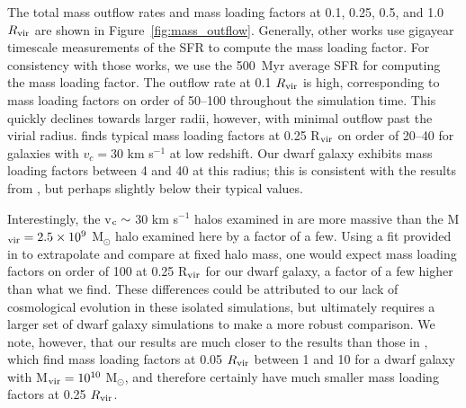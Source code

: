 \documentclass[twocolumn]{aastex61}
\begin{document}
The total mass outflow rates and mass loading factors at 0.1, 0.25, 0.5, and 1.0 $R_{\rm vir}$ are shown in Figure~\ref{fig:mass_outflow}. Generally, other works use gigayear timescale measurements of the SFR to compute the mass loading factor. For consistency with those works, we use the 500~Myr average SFR for computing the mass loading factor. The outflow rate at 0.1 $R_{\rm vir}$ is high, corresponding to mass loading factors on order of 50--100 throughout the simulation time. This quickly declines towards larger radii, however, with minimal outflow past the virial radius. \citet{Muratov2015} finds typical mass loading factors at 0.25 R$_{\rm vir}$ on order of 20--40 for galaxies with $v_{c} = 30$ km s$^{-1}$ at low redshift. Our dwarf galaxy exhibits mass loading factors between 4 and 40 at this radius; this is consistent with the results from \citet{Muratov2015}, but perhaps slightly below their typical values. 

Interestingly, the v$_{\rm c}\sim$ 30 km s$^{-1}$ halos examined in \citet{Muratov2015} are more massive than the M$_{\rm vir} = 2.5\times 10^9$ M$_{\odot}$ halo examined here by a factor of a few. Using a fit provided in \citet{Muratov2015} to extrapolate and compare at fixed halo mass, one would expect mass loading factors on order of 100 at 0.25 R$_{\rm vir}$ for our dwarf galaxy, a factor of a few higher than what we find. These differences could be attributed to our lack of cosmological evolution in these isolated simulations, but ultimately requires a larger set of dwarf galaxy simulations to make a more robust comparison. We note, however, that our results are much closer to the \citep{Muratov2015} results than those in \citet{Hu2016,Hu2017}, which find mass loading factors at 0.05 $R_{\rm vir}$ between 1 and 10 for a dwarf galaxy with M$_{\rm vir} = 10^{10}$ M$_{\odot}$, and therefore certainly have much smaller mass loading factors at 0.25 $R_{\rm vir}$.
\end{document}
